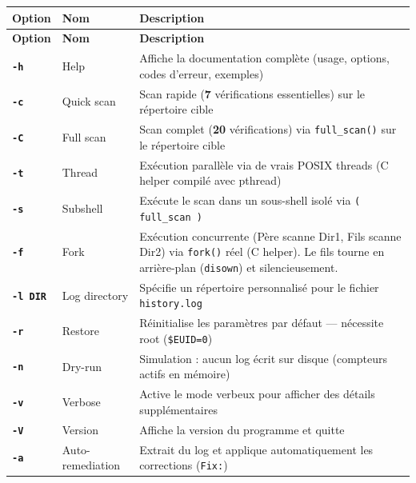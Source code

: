 \documentclass[12pt,a4paper]{article}
\newcommand{\opt}[1]{\texttt{\textcolor{bleuMed}{\textbf{#1}}}}
\newcommand{\cmd}[1]{\texttt{\textcolor{codeText}{#1}}}
\newcommand{\fichier}[1]{\texttt{\textcolor{bleuENSET}{#1}}}
\begin{document}
\vspace{6pt}
\begin{longtable}{C{1.6cm} L{2.4cm} L{9.8cm}}
  \textbf{\color{white}Option} & \textbf{\color{white}Nom} & \textbf{\color{white}Description} \\
  \endfirsthead
  \textbf{\color{white}Option} & \textbf{\color{white}Nom} & \textbf{\color{white}Description} \\
  \endhead
  \opt{-h}       & Help            & Affiche la documentation complète (usage, options, codes d'erreur, exemples) \\
  \opt{-c}       & Quick scan      & Scan rapide (\textbf{7} vérifications essentielles) sur le répertoire cible \\
  \opt{-C}       & Full scan       & Scan complet (\textbf{20} vérifications) via \cmd{full\_scan()} sur le répertoire cible \\
  \opt{-t}       & Thread          & Exécution parallèle via de vrais POSIX threads (C helper compilé avec pthread) \\
  \opt{-s}       & Subshell        & Exécute le scan dans un sous-shell isolé via \cmd{( full\_scan )} \\
  \opt{-f}       & Fork            & Exécution concurrente (Père scanne Dir1, Fils scanne Dir2) via \cmd{fork()} réel (C helper). Le fils tourne en arrière-plan (\cmd{disown}) et silencieusement. \\
  \opt{-l DIR}   & Log directory   & Spécifie un répertoire personnalisé pour le fichier \fichier{history.log} \\
  \opt{-r}       & Restore         & Réinitialise les paramètres par défaut --- nécessite root (\cmd{\$EUID=0}) \\
  \opt{-n}       & Dry-run         & Simulation : aucun log écrit sur disque (compteurs actifs en mémoire) \\
  \opt{-v}       & Verbose         & Active le mode verbeux pour afficher des détails supplémentaires \\
  \opt{-V}       & Version         & Affiche la version du programme et quitte \\
  \opt{-a}       & Auto-remediation & Extrait du log et applique automatiquement les corrections (\cmd{Fix:}) \\

\end{longtable}
\end{document}
